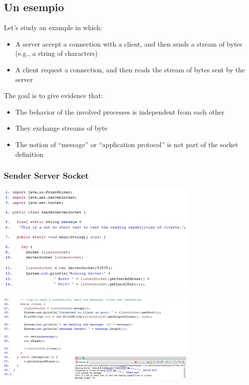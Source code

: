 \subsection{Un esempio}
Let's study an example in which:
\begin{itemize}
    \item A server accept a connection with a client, and then sends a stream of bytes (e.g., a string of characters)
    \item A client request a connection, and then reads the stream of bytes sent by the server
\end{itemize}
The goal is to give evidence that:
\begin{itemize}
    \item The behavior of the involved processes is independent from each other
    \item They exchange streams of byte 
    \item The notion of “message” or “application protocol” is not part of the socket definition
\end{itemize}

\subsubsection{Sender Server Socket}
\begin{center}
    \includegraphics[width=0.75\textwidth]{img/SenderServerSocket1.jpg}
\end{center}
\begin{center}
    \includegraphics[width=0.75\textwidth]{img/SenderServerSocket2.jpg}
\end{center}

